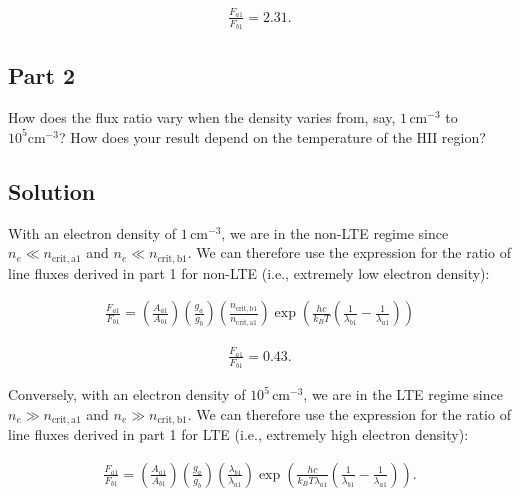 \documentclass[12pt]{article}
\begin{document}
\begin{align*}
\boxed{ \frac{F_{a1}}{F_{b1}} = 2.31 }.
\end{align*}


\subsection*{Part 2}

How does the flux ratio vary when the density varies from, say, $1\,\mathrm{cm^{-3}}$ to $10^5\mathrm{cm^{-3}}$? How does your result depend on the temperature of the $\mathrm{HII}$ region?


\subsection*{Solution}

With an electron density of $1\,\mathrm{cm^{-3}}$, we are in the non-LTE regime since $n_e \ll n_\mathrm{crit,a1}$ and $n_e \ll n_\mathrm{crit,b1}$. We can therefore use the expression for the ratio of line fluxes derived in part 1 for non-LTE (i.e., extremely low electron density):

\begin{align*}
\frac{F_{a1}}{F_{b1}} = \left(\frac{A_{a1}}{A_{b1}}\right) \left(\frac{g_a}{g_b}\right) \left(\frac{n_\mathrm{crit,b1}}{n_\mathrm{crit,a1}}\right) \exp \left(\frac{hc}{k_BT} \left(\frac{1}{\lambda_{b1}} - \frac{1}{\lambda_{a1}}\right)\right)
\end{align*}

\begin{align*}
\boxed{ \frac{F_{a1}}{F_{b1}} = 0.43 }.
\end{align*}

Conversely, with an electron density of $10^5\,\mathrm{cm^{-3}}$, we are in the LTE regime since $n_e \gg n_\mathrm{crit,a1}$ and $n_e \gg n_\mathrm{crit,b1}$. We can therefore use the expression for the ratio of line fluxes derived in part 1 for LTE (i.e., extremely high electron density):

\begin{align*}
\frac{F_{a1}}{F_{b1}} = \left(\frac{A_{a1}}{A_{b1}}\right) \left(\frac{g_a}{g_b}\right) \left(\frac{\lambda_{b1}}{\lambda_{a1}}\right) \exp \left(\frac{hc}{k_BT\lambda_{a1}} \left(\frac{1}{\lambda_{b1}} - \frac{1}{\lambda_{a1}}\right) \right).
\end{align*}
\end{document}
